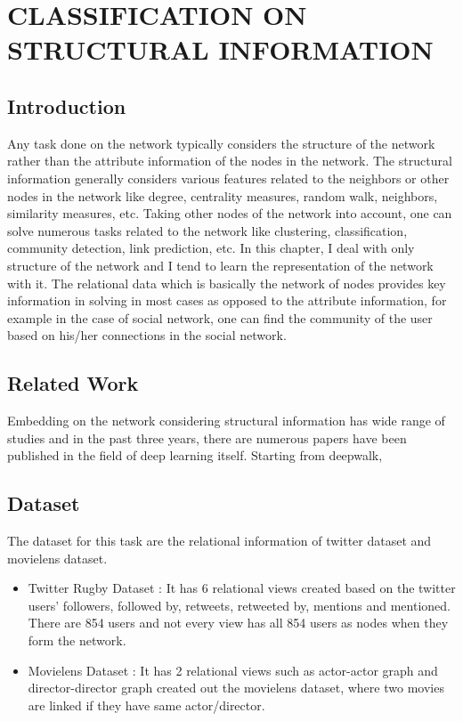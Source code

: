 \chapter{CLASSIFICATION ON STRUCTURAL INFORMATION}
 \label{chap:structural}
\section{Introduction}
Any task done on the network typically considers the structure of the network rather than the attribute information of the nodes in the network. The structural information generally considers various features related to the neighbors or other nodes in the network like degree, centrality measures, random walk, neighbors, similarity measures, etc. Taking other nodes of the network into account, one can solve numerous tasks related to the network like clustering, classification, community detection, link prediction, etc. In this chapter, I deal with only structure of the network and I tend to learn the representation of the network with it. The relational data which is basically the network of nodes provides key information in solving in most cases as opposed to the attribute information, for example in the case of social network, one can find the community of the user based on his/her connections in the social network.
\section{Related Work} 
 \label{sec:rwgc}
Embedding on the network considering structural information has wide range of studies and in the past three years, there are numerous papers have been published in the field of deep learning itself. Starting from deepwalk, \cite{deepwalk}
\section{Dataset}
\label{sec:datagc}
The dataset for this task are the relational information of twitter dataset and movielens dataset.
\begin{itemize}
    \item Twitter Rugby Dataset : It has 6 relational views created based on the twitter users' followers, followed by, retweets, retweeted by, mentions and mentioned. There are 854 users and not every view has all 854 users as nodes when they form the network.
    \item Movielens Dataset : It has 2 relational views such as actor-actor graph and director-director graph created out the movielens dataset, where two movies are linked if they have same actor/director.
\end{itemize}

